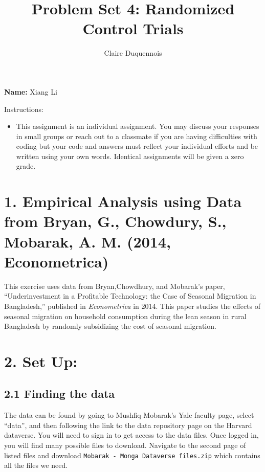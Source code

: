 \documentclass[
]{article}
\title{Problem Set 4: Randomized Control Trials}
\author{Claire Duquennois}
\date{}
\providecommand{\tightlist}{%
  \setlength{\itemsep}{0pt}\setlength{\parskip}{0pt}}
\begin{document}
\maketitle

\textbf{Name:} Xiang Li

Instructions:

\begin{itemize}
\tightlist
\item
  This assignment is an individual assignment. You may discuss your
  responses in small groups or reach out to a classmate if you are
  having difficulties with coding but your code and answers must reflect
  your individual efforts and be written using your own words. Identical
  assignments will be given a zero grade.
\end{itemize}

\hypertarget{empirical-analysis-using-data-from-bryan-g.-chowdury-s.-mobarak-a.-m.-2014-econometrica}{%
\section{1. Empirical Analysis using Data from Bryan, G., Chowdury, S.,
Mobarak, A. M. (2014,
Econometrica)}\label{empirical-analysis-using-data-from-bryan-g.-chowdury-s.-mobarak-a.-m.-2014-econometrica}}

This exercise uses data from Bryan,Chowdhury, and Mobarak's paper,
``Underinvestment in a Profitable Technology: the Case of Seasonal
Migration in Bangladesh,'' published in \emph{Econometrica} in 2014.
This paper studies the effects of seasonal migration on household
consumption during the lean season in rural Bangladesh by randomly
subsidizing the cost of seasonal migration.

\hypertarget{set-up}{%
\section{2. Set Up:}\label{set-up}}

\hypertarget{finding-the-data}{%
\subsection{2.1 Finding the data}\label{finding-the-data}}

The data can be found by going to Mushfiq Mobarak's Yale faculty page,
select ``data'', and then following the link to the data repository page
on the Harvard dataverse. You will need to sign in to get access to the
data files. Once logged in, you will find many possible files to
download. Navigate to the second page of listed files and download
\texttt{Mobarak\ -\ Monga\ Dataverse\ files.zip} which contains all the
files we need.
\end{document}
